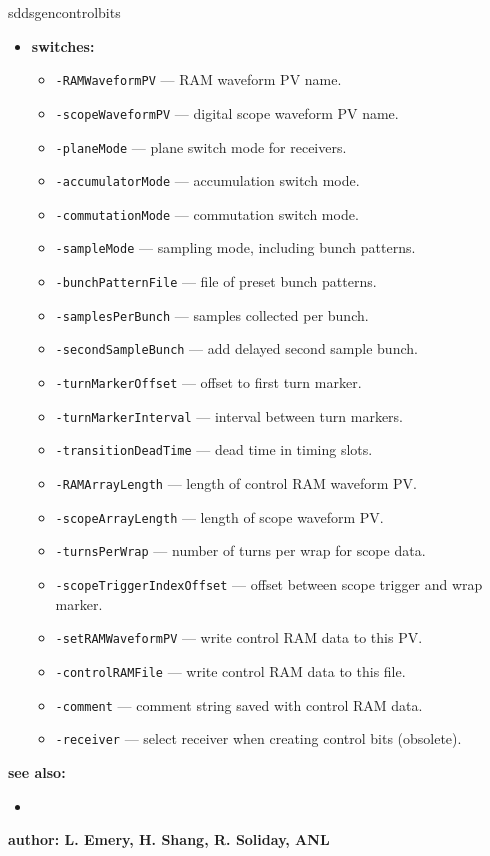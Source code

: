 \begin{sddsprog}{sddsgencontrolbits}
\begin{itemize}
%
\item {\bf switches:}
    \begin{itemize}
    \item {\tt -RAMWaveformPV} --- RAM waveform PV name.
    \item {\tt -scopeWaveformPV} --- digital scope waveform PV name.
    \item {\tt -planeMode} --- plane switch mode for receivers.
    \item {\tt -accumulatorMode} --- accumulation switch mode.
    \item {\tt -commutationMode} --- commutation switch mode.
    \item {\tt -sampleMode} --- sampling mode, including bunch patterns.
    \item {\tt -bunchPatternFile} --- file of preset bunch patterns.
    \item {\tt -samplesPerBunch} --- samples collected per bunch.
    \item {\tt -secondSampleBunch} --- add delayed second sample bunch.
    \item {\tt -turnMarkerOffset} --- offset to first turn marker.
    \item {\tt -turnMarkerInterval} --- interval between turn markers.
    \item {\tt -transitionDeadTime} --- dead time in timing slots.
    \item {\tt -RAMArrayLength} --- length of control RAM waveform PV.
    \item {\tt -scopeArrayLength} --- length of scope waveform PV.
    \item {\tt -turnsPerWrap} --- number of turns per wrap for scope data.
    \item {\tt -scopeTriggerIndexOffset} --- offset between scope trigger and wrap marker.
    \item {\tt -setRAMWaveformPV} --- write control RAM data to this PV.
    \item {\tt -controlRAMFile} --- write control RAM data to this file.
    \item {\tt -comment} --- comment string saved with control RAM data.
    \item {\tt -receiver} --- select receiver when creating control bits (obsolete).
    \end{itemize}
\end{itemize}

\item {\bf see also:}
    \begin{itemize}
%
%
    \item {}
    \end{itemize}
%
%
\item {\bf author: L. Emery, H. Shang, R. Soliday, ANL}
\end{sddsprog}
